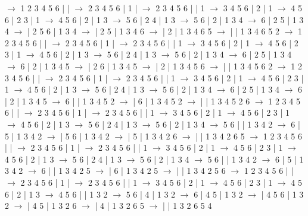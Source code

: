 \documentclass{article}
\begin{document}
\newline
 $\rightarrow$ 1 2 3 4 5 6 |  |  $\rightarrow$ 2 3 4 5 6 | 1 |  $\rightarrow$ 2 3 4 5 6 |  | 1 $\rightarrow$ 3 4 5 6 | 2 | 1 $\rightarrow$ 4 5 6 | 2 3 | 1 $\rightarrow$ 4 5 6 | 2 | 1 3 $\rightarrow$ 5 6 | 2 4 | 1 3 $\rightarrow$ 5 6 | 2 | 1 3 4 $\rightarrow$ 6 | 2 5 | 1 3 4 $\rightarrow$  | 2 5 6 | 1 3 4 $\rightarrow$  | 2 5 | 1 3 4 6 $\rightarrow$  | 2 | 1 3 4 6 5 $\rightarrow$  |  | 1 3 4 6 5 2
\newline
 $\rightarrow$ 1 2 3 4 5 6 |  |  $\rightarrow$ 2 3 4 5 6 | 1 |  $\rightarrow$ 2 3 4 5 6 |  | 1 $\rightarrow$ 3 4 5 6 | 2 | 1 $\rightarrow$ 4 5 6 | 2 3 | 1 $\rightarrow$ 4 5 6 | 2 | 1 3 $\rightarrow$ 5 6 | 2 4 | 1 3 $\rightarrow$ 5 6 | 2 | 1 3 4 $\rightarrow$ 6 | 2 5 | 1 3 4 $\rightarrow$ 6 | 2 | 1 3 4 5 $\rightarrow$  | 2 6 | 1 3 4 5 $\rightarrow$  | 2 | 1 3 4 5 6 $\rightarrow$  |  | 1 3 4 5 6 2
\newline
 $\rightarrow$ 1 2 3 4 5 6 |  |  $\rightarrow$ 2 3 4 5 6 | 1 |  $\rightarrow$ 2 3 4 5 6 |  | 1 $\rightarrow$ 3 4 5 6 | 2 | 1 $\rightarrow$ 4 5 6 | 2 3 | 1 $\rightarrow$ 4 5 6 | 2 | 1 3 $\rightarrow$ 5 6 | 2 4 | 1 3 $\rightarrow$ 5 6 | 2 | 1 3 4 $\rightarrow$ 6 | 2 5 | 1 3 4 $\rightarrow$ 6 | 2 | 1 3 4 5 $\rightarrow$ 6 |  | 1 3 4 5 2 $\rightarrow$  | 6 | 1 3 4 5 2 $\rightarrow$  |  | 1 3 4 5 2 6
\newline
 $\rightarrow$ 1 2 3 4 5 6 |  |  $\rightarrow$ 2 3 4 5 6 | 1 |  $\rightarrow$ 2 3 4 5 6 |  | 1 $\rightarrow$ 3 4 5 6 | 2 | 1 $\rightarrow$ 4 5 6 | 2 3 | 1 $\rightarrow$ 4 5 6 | 2 | 1 3 $\rightarrow$ 5 6 | 2 4 | 1 3 $\rightarrow$ 5 6 | 2 | 1 3 4 $\rightarrow$ 5 6 |  | 1 3 4 2 $\rightarrow$ 6 | 5 | 1 3 4 2 $\rightarrow$  | 5 6 | 1 3 4 2 $\rightarrow$  | 5 | 1 3 4 2 6 $\rightarrow$  |  | 1 3 4 2 6 5
\newline
 $\rightarrow$ 1 2 3 4 5 6 |  |  $\rightarrow$ 2 3 4 5 6 | 1 |  $\rightarrow$ 2 3 4 5 6 |  | 1 $\rightarrow$ 3 4 5 6 | 2 | 1 $\rightarrow$ 4 5 6 | 2 3 | 1 $\rightarrow$ 4 5 6 | 2 | 1 3 $\rightarrow$ 5 6 | 2 4 | 1 3 $\rightarrow$ 5 6 | 2 | 1 3 4 $\rightarrow$ 5 6 |  | 1 3 4 2 $\rightarrow$ 6 | 5 | 1 3 4 2 $\rightarrow$ 6 |  | 1 3 4 2 5 $\rightarrow$  | 6 | 1 3 4 2 5 $\rightarrow$  |  | 1 3 4 2 5 6
\newline
 $\rightarrow$ 1 2 3 4 5 6 |  |  $\rightarrow$ 2 3 4 5 6 | 1 |  $\rightarrow$ 2 3 4 5 6 |  | 1 $\rightarrow$ 3 4 5 6 | 2 | 1 $\rightarrow$ 4 5 6 | 2 3 | 1 $\rightarrow$ 4 5 6 | 2 | 1 3 $\rightarrow$ 4 5 6 |  | 1 3 2 $\rightarrow$ 5 6 | 4 | 1 3 2 $\rightarrow$ 6 | 4 5 | 1 3 2 $\rightarrow$  | 4 5 6 | 1 3 2 $\rightarrow$  | 4 5 | 1 3 2 6 $\rightarrow$  | 4 | 1 3 2 6 5 $\rightarrow$  |  | 1 3 2 6 5 4
\end{document}
